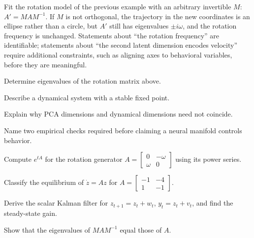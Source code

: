 \begin{workedexample}
Fit the rotation model of the previous example with an arbitrary invertible $M$: $A'=MAM^{-1}$. If $M$ is not orthogonal, the trajectory in the new coordinates is an ellipse rather than a circle, but $A'$ still has eigenvalues $\pm i\omega$, and the rotation frequency is unchanged. Statements about ``the rotation frequency'' are identifiable; statements about ``the second latent dimension encodes velocity'' require additional constraints, such as aligning axes to behavioral variables, before they are meaningful.
\end{workedexample}
\begin{exercises}
\item Determine eigenvalues of the rotation matrix above.
\item Describe a dynamical system with a stable fixed point.
\item Explain why PCA dimensions and dynamical dimensions need not coincide.
\item Name two empirical checks required before claiming a neural manifold controls behavior.
\item Compute $e^{tA}$ for the rotation generator $A=\begin{bmatrix}0&-\omega\\\omega&0\end{bmatrix}$ using its power series.
\item Classify the equilibrium of $\dot z=Az$ for $A=\begin{bmatrix}-1&-4\\1&-1\end{bmatrix}$.
\item Derive the scalar Kalman filter for $z_{t+1}=z_t+w_t$, $y_t=z_t+v_t$, and find the steady-state gain.
\item Show that the eigenvalues of $MAM^{-1}$ equal those of $A$.
\end{exercises}
